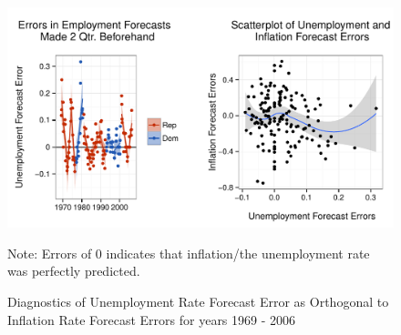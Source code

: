 \documentclass[a4paper]{article}\usepackage{graphicx, color}
\newenvironment{knitrout}{}{} %
\begin{document}
\begin{figure}[t]
    \caption{Diagnostics of Unemployment Rate Forecast Error as Orthogonal to Inflation Rate Forecast Errors for years 1969 - 2006}
    \label{Unemployment}
    \begin{center}
    
\begin{knitrout}
\color{fgcolor}\includegraphics[width=0.95\linewidth]{figure/GraphPartisanErrorUnemploy} 
\end{knitrout}


    \end{center}
    \begin{singlespace}
        {\scriptsize{Note: Errors of 0 indicates that inflation/the unemployment rate was perfectly predicted.}}
    \end{singlespace}
\end{figure}



\clearpage



\end{document}
